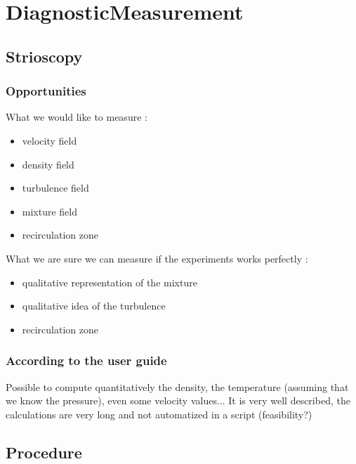 \renewcommand\evenpagerightmark{{\scshape\small Diagnostic}}
\chapter[DiagnosticMeasurement]%
{DiagnosticMeasurement}
\label{diagnostic_chapt}

\section{Strioscopy}

\subsection{Opportunities}

What we would like to measure :

\begin{itemize}
\item velocity field
\item density field
\item turbulence field
\item mixture field
\item recirculation zone
\end{itemize}

What we are sure we can measure if the experiments works perfectly  :

\begin{itemize}
\item qualitative representation of the mixture
\item qualitative idea of the turbulence 
\item recirculation zone
\end{itemize}



\subsection{According to the user guide}

Possible to compute quantitatively the density, the temperature (assuming that we know the pressure), even some velocity values... It is very well described, the calculations are very long and not automatized in a script (feasibility?)

\section{Procedure}

